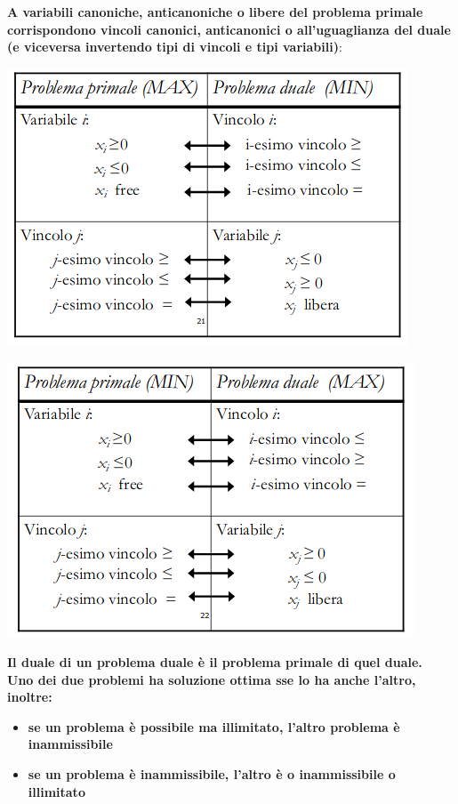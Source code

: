 \message{ !name(ro.tex)}\documentclass[a4paper,12pt, oneside]{book}
\begin{document}
\textbf{A variabili canoniche, anticanoniche o libere del problema
  primale corrispondono vincoli canonici, anticanonici o
  all'uguaglianza del duale (e viceversa invertendo tipi di vincoli e
  tipi variabili)}:
\begin{center}
  \includegraphics[scale = 0.7]{img/dua2.png}
\end{center}
\begin{center}
  \includegraphics[scale = 0.7]{img/dua3.png}
\end{center}
\textbf{Il duale di un problema duale è il problema primale di quel
  duale.}\\
\textbf{Uno dei due problemi ha soluzione ottima sse lo ha anche
  l'altro, inoltre:}
\begin{itemize}
  \item \textbf{se un problema è possibile ma illimitato, l’altro
    problema è inammissibile}
  \item \textbf{se un problema è inammissibile, l’altro è o
    inammissibile o illimitato}
\end{itemize}
\end{document}
